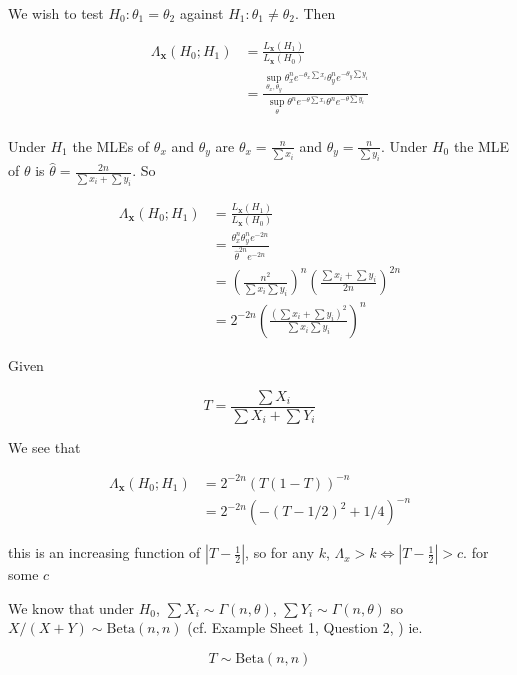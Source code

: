 \documentclass[a4paper]{article}
\begin{document}
We wish to test $ H_{0}: \theta_{1} = \theta_{2} $ against $ H_{1} : \theta_{1} \neq \theta_{2} $. Then 

\begin{align*}
\Lambda_\mathbf{x} (H_0; H_1) & = \frac{L_\mathbf{x}(H_1)}{L_\mathbf{x}(H_0)} \\
& = \frac{ \sup_{\theta_{x},\theta_{y}} \theta_{x}^{n} e^{-\theta_{x} \sum x_{i} } \theta_{y}^{n} e^{-\theta_{y} \sum y_{i} }}{ \sup_{\theta} \theta^{n} e^{-\theta \sum x_{i} } \theta^{n} e^{-\theta \sum y_{i} }} \\
\end{align*}

Under $ H_{1} $ the MLEs of $ \theta_{x} $ and $ \theta_{y} $ are $ \theta_{x} = \frac{n}{\sum x_{i}} $ and $ \theta_{y} = \frac{n}{\sum y_{i}} $. Under $ H_{0} $ the MLE of $ \theta $ is $\hat{\theta} = \frac{2n}{\sum x_{i} + \sum y_{i}}$. So

\begin{align*}
\Lambda_\mathbf{x} (H_0; H_1) & = \frac{L_\mathbf{x}(H_1)}{L_\mathbf{x}(H_0)} \\
& = \frac{  \theta_{x}^{n} \theta_{y}^{n} e^{-2n}}{ \hat{\theta}^{2n}  e^{-2n} } \\ 
& = \left( \frac{n^{2}}{\sum x_{i} \sum y_{i}} \right)^{n}  \left( \frac{\sum x_{i} + \sum y_{i}}{2n} \right)^{2n} \\
& = 2^{-2n} \left(   \frac{\left(  \sum x_{i} + \sum y_{i} \right)^{2} }{\sum x_{i} \sum y_{i}} \right)^{n} 
\end{align*}


Given 

\[ T = \frac{\sum X_{i}}{\sum X_{i} + \sum Y_{i}} \]

We see that

\begin{align*}
\Lambda_\mathbf{x} (H_0; H_1) & = 2^{-2n} \left(  T(1-T) \right)^{-n} \\
& = 2^{-2n} \left(  - (T - 1/2)^{2} + 1/4 \right)^{-n}  
\end{align*}

this is an increasing function of $ \left| T - \frac{1}{2} \right| $, so for any $ k $, $ \Lambda_{x} > k \iff \left| T - \frac{1}{2} \right| > c $. for some $ c $


We know that under $ H_{0} $, $ \sum X_{i} \sim \Gamma(n,\theta) $, $ \sum Y_{i} \sim \Gamma(n,\theta) $ so $ X/(X+Y) \sim \text{Beta}(n,n) $ (cf. Example Sheet 1, Question 2, ) ie.

\[ T \sim \text{Beta}(n,n) \]
\end{document}
